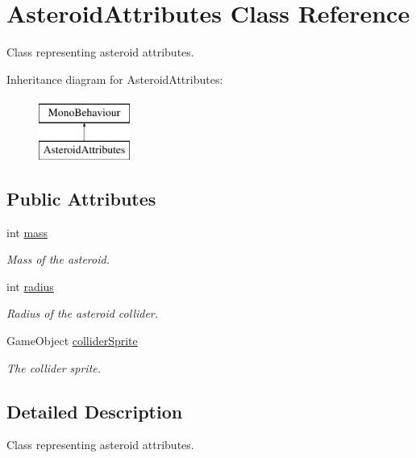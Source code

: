 \hypertarget{class_asteroid_attributes}{}\section{Asteroid\+Attributes Class Reference}
\label{class_asteroid_attributes}


Class representing asteroid attributes.  


Inheritance diagram for Asteroid\+Attributes\+:\begin{figure}[H]
\begin{center}
\leavevmode
\includegraphics[height=2.000000cm]{class_asteroid_attributes}
\end{center}
\end{figure}
\subsection*{Public Attributes}
\begin{DoxyCompactItemize}
\item 
int \mbox{\hyperlink{class_asteroid_attributes_a671f2c91e2ad27a1f1d45346ec8dcd22}{mass}}
\begin{DoxyCompactList}\small\item\em Mass of the asteroid. \end{DoxyCompactList}\item 
int \mbox{\hyperlink{class_asteroid_attributes_a8cc9267ef0f5534260f7ccb7c16c04ca}{radius}}
\begin{DoxyCompactList}\small\item\em Radius of the asteroid collider. \end{DoxyCompactList}\item 
Game\+Object \mbox{\hyperlink{class_asteroid_attributes_a25d09f5bc06ec1aa4761fe4ec30eebca}{collider\+Sprite}}
\begin{DoxyCompactList}\small\item\em The collider sprite. \end{DoxyCompactList}\end{DoxyCompactItemize}


\subsection{Detailed Description}
Class representing asteroid attributes. 



